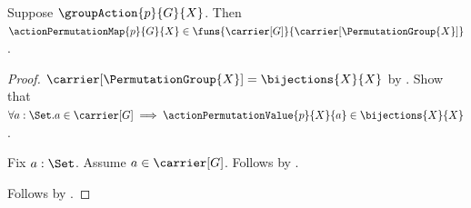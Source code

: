 \begin{proposition}\label{action_permutation_map_type}
    Suppose $\groupAction{p}{G}{X}$.
    Then $\actionPermutationMap{p}{G}{X}\in
        \funs{\carrier[G]}{\carrier[\PermutationGroup{X}]}$.
\end{proposition}
\begin{proof}
    $\carrier[\PermutationGroup{X}]=\bijections{X}{X}$ by
        .
    Show that $\forall a:\Set. a\in\carrier[G]\implies
        \actionPermutationValue{p}{X}{a}
            \in\bijections{X}{X}$.
    \begin{subproof}
        Fix $a:\Set$.
        Assume $a\in\carrier[G]$.
        Follows by .
    \end{subproof}
    Follows by
        .
\end{proof}

